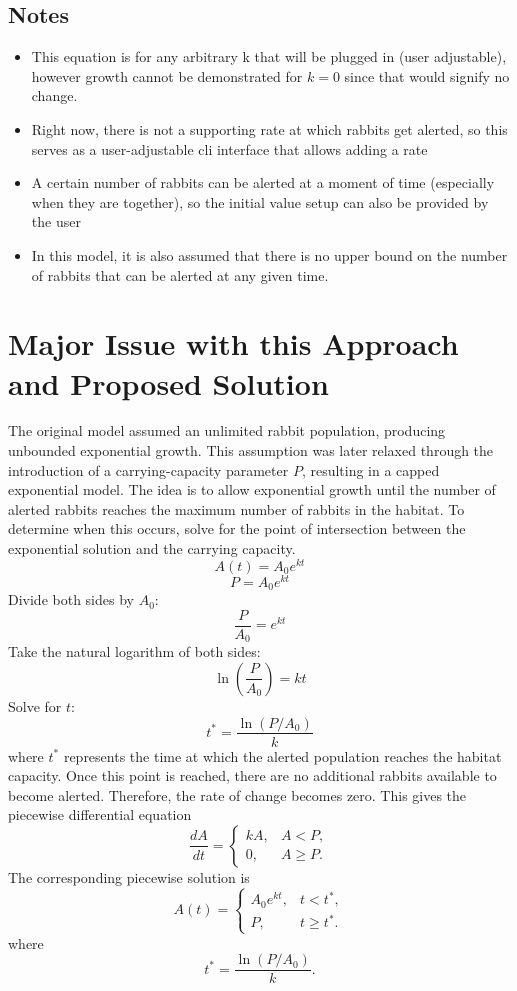 \documentclass{article}
\begin{document}
\subsection{Notes}
\begin{itemize}
    \item This equation is for any arbitrary k that will be plugged in (user adjustable), however growth cannot be demonstrated for $k = 0$ since
that would signify no change.
    \item Right now, there is not a supporting rate at which rabbits get alerted, so this serves as a user-adjustable cli interface that allows adding a rate
    \item A certain number of rabbits can be alerted at a moment of time (especially when they are together), so the initial value setup can also be provided by the user
    \item In this model, it is also assumed that there is no upper bound on the number of rabbits that can be alerted at any given time.
\end{itemize}

\section{Major Issue with this Approach and Proposed Solution} 
The original model assumed an unlimited rabbit population, producing unbounded exponential growth. 
This assumption was later relaxed through the introduction of a carrying-capacity parameter $P$, 
resulting in a capped exponential model. The idea is to allow exponential growth until the number 
of alerted rabbits reaches the maximum number of rabbits in the habitat. To determine when this occurs, 
solve for the point of intersection between the exponential solution and the carrying capacity.
 \[ A(t)=A_0e^{kt} \] \[ P=A_0e^{kt} \] 
 Divide both sides by $A_0$: 
 \[ \frac{P}{A_0}=e^{kt} \] 
 Take the natural logarithm of both sides:
\[ \ln\left(\frac{P}{A_0}\right)=kt \] 
 Solve for $t$: 
 \[ t^*=\frac{\ln(P/A_0)}{k} \] 
 where $t^*$ represents the time at which the alerted population reaches the habitat capacity. 
 Once this point is reached, there are no additional rabbits available to become alerted. Therefore, 
 the rate of change becomes zero. This gives the piecewise differential equation 
 \[ \frac{dA}{dt} = \begin{cases} kA, & A < P, \\ 0, & A \ge P. \end{cases} \] 
 The corresponding piecewise solution is 
 \[ A(t) = \begin{cases} A_0e^{kt}, & t < t^*, \\ P, & t \ge t^*. \end{cases} \] 
 where \[ t^*=\frac{\ln(P/A_0)}{k}. \]
\end{document}
